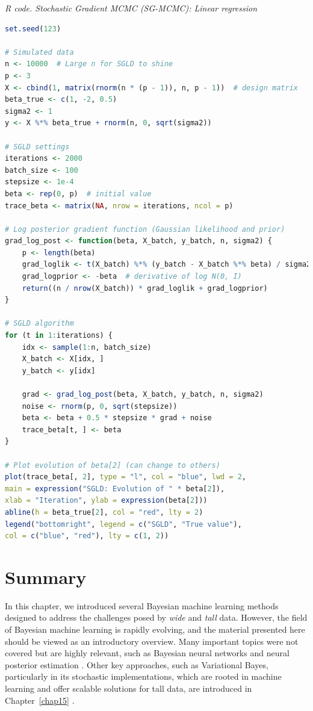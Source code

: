 \begin{tcolorbox}[enhanced,width=4.67in,center upper,
	fontupper=\large\bfseries,drop shadow southwest,sharp corners]
	\textit{R code. Stochastic Gradient MCMC (SG-MCMC): Linear regression}
	\begin{VF}
		\begin{lstlisting}[language=R]
set.seed(123)

# Simulated data
n <- 10000  # Large n for SGLD to shine
p <- 3
X <- cbind(1, matrix(rnorm(n * (p - 1)), n, p - 1))  # design matrix
beta_true <- c(1, -2, 0.5)
sigma2 <- 1
y <- X %*% beta_true + rnorm(n, 0, sqrt(sigma2))

# SGLD settings
iterations <- 2000
batch_size <- 100
stepsize <- 1e-4
beta <- rep(0, p)  # initial value
trace_beta <- matrix(NA, nrow = iterations, ncol = p)

# Log posterior gradient function (Gaussian likelihood and prior)
grad_log_post <- function(beta, X_batch, y_batch, n, sigma2) {
	p <- length(beta)
	grad_loglik <- t(X_batch) %*% (y_batch - X_batch %*% beta) / sigma2
	grad_logprior <- -beta  # derivative of log N(0, I)
	return((n / nrow(X_batch)) * grad_loglik + grad_logprior)
}

# SGLD algorithm
for (t in 1:iterations) {
	idx <- sample(1:n, batch_size)
	X_batch <- X[idx, ]
	y_batch <- y[idx]
	
	grad <- grad_log_post(beta, X_batch, y_batch, n, sigma2)
	noise <- rnorm(p, 0, sqrt(stepsize))
	beta <- beta + 0.5 * stepsize * grad + noise
	trace_beta[t, ] <- beta
}

# Plot evolution of beta[2] (can change to others)
plot(trace_beta[, 2], type = "l", col = "blue", lwd = 2,
main = expression("SGLD: Evolution of " * beta[2]),
xlab = "Iteration", ylab = expression(beta[2]))
abline(h = beta_true[2], col = "red", lty = 2)
legend("bottomright", legend = c("SGLD", "True value"),
col = c("blue", "red"), lty = c(1, 2))
		\end{lstlisting}
	\end{VF}
\end{tcolorbox}

\section{Summary}\label{13_6}

In this chapter, we introduced several Bayesian machine learning methods designed to address the challenges posed by \textit{wide} and \textit{tall} data. However, the field of Bayesian machine learning is rapidly evolving, and the material presented here should be viewed as an introductory overview. Many important topics were not covered but are highly relevant, such as Bayesian neural networks \cite{neal2012bayesian} and neural posterior estimation \cite{papamakarios2016fast,lueckmann2017flexible,greenberg2019automatic}. Other key approaches, such as Variational Bayes, particularly in its stochastic implementations, which are rooted in machine learning and offer scalable solutions for tall data, are introduced in Chapter~\ref{chap15} \cite{wainwright2008graphical}.

